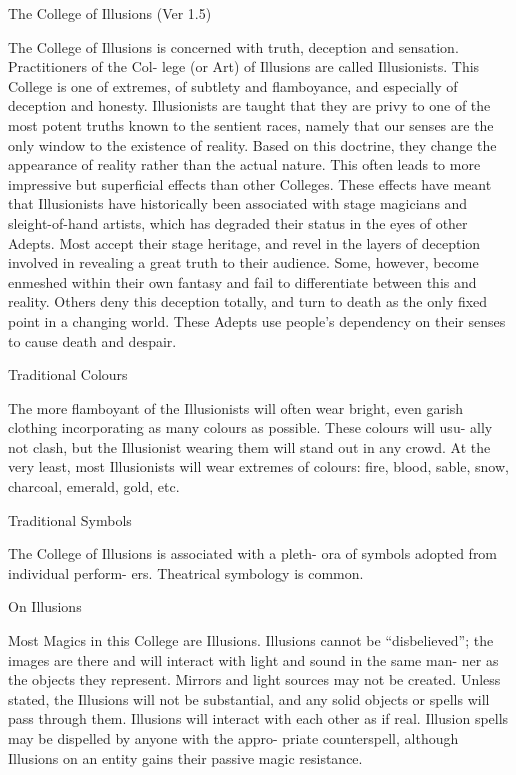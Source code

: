 \begin{Chapter}{The College of Illusions (Ver 1.5)}

The College of Illusions is concerned with truth, deception and
sensation.  Practitioners of the Col- lege (or Art) of Illusions are
called Illusionists.  This College is one of extremes, of subtlety and
flamboyance, and especially of deception and honesty.  Illusionists
are taught that they are privy to one of the most potent truths known
to the sentient races, namely that our senses are the only window to
the existence of reality.  Based on this doctrine, they change the
appearance of reality rather than the actual nature.  This often leads
to more impressive but superficial effects than other Colleges. These
effects have meant that Illusionists have historically been associated
with stage magicians and sleight-of-hand artists, which has degraded
their status in the eyes of other Adepts.  Most accept their stage
heritage, and revel in the layers of deception involved in revealing a
great truth to their audience.  Some, however, become enmeshed within
their own fantasy and fail to differentiate between this and reality.
Others deny this deception totally, and turn to death as the only
fixed point in a changing world. These Adepts use people’s dependency
on their senses to cause death and despair.

Traditional Colours 

The  more  flamboyant  of  the  Illusionists  will  often 
wear  bright,  even  garish  clothing  incorporating  as 
many  colours  as  possible.  These  colours  will  usu-
ally not clash, but the Illusionist wearing them will 
stand  out  in  any  crowd.  At  the  very  least,  most 
Illusionists  will  wear  extremes  of  colours:  fire, 
blood, sable, snow, charcoal, emerald, gold, etc. 

Traditional Symbols 

The College of Illusions is associated with a pleth-
ora  of  symbols  adopted  from  individual  perform-
ers. Theatrical symbology is common. 

On Illusions 

Most Magics in this College are Illusions. Illusions 
cannot  be  “disbelieved”;  the  images  are  there  and 
will interact with light and sound in the same man-
ner as the objects they represent. Mirrors and light 
sources  may  not  be  created.  Unless  stated,  the 
Illusions  will  not  be  substantial,  and  any  solid 
objects  or  spells  will  pass  through  them.  Illusions 
will  interact  with  each  other  as  if  real.  Illusion 
spells may be dispelled by anyone  with the appro-
priate  counterspell,  although  Illusions  on  an  entity 
gains their passive magic resistance. 


\end{Chapter}
